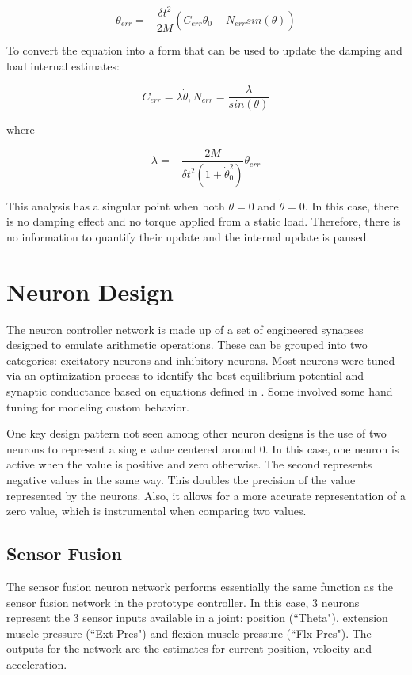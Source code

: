 \documentclass[letterpaper, 10 pt, conference]{IEEEconf} %
\newcommand{\bbs}[1]{\section{#1}}
\newcommand{\bbss}[1]{\subsection{#1}}
\begin{document}
\begin{equation}
\theta_{err} = - \dfrac{\delta t^{2}}{2M}(C_{err} \dot{\theta}_{0} + N_{err} sin(\theta))
\end{equation}

To convert the equation into a form that can be used to update the damping and
load internal estimates:

\begin{equation}
C_{err} = \lambda \dot{\theta}, N_{err} = \dfrac{\lambda}{sin(\theta)}
\end{equation}

where

\begin{equation}
\lambda 
=
- \dfrac{2M}{\delta t^{2} (1 + \dot{\theta}_{0}^{2})} \theta_{err}
\end{equation}

This analysis has a singular point when both $\theta = 0$ and $\dot{\theta} = 0$. In this case, there is no damping effect and no torque applied from a static
load. Therefore, there is no information to quantify their update and the internal update is paused.

\bbs{Neuron Design}
\label{chap:neuron_design}

The neuron controller network is made up of a set of engineered synapses
designed to emulate arithmetic operations. These can be grouped into two
categories: excitatory neurons and inhibitory neurons. Most neurons were tuned
via an optimization process to identify the best equilibrium potential and
synaptic conductance based on equations defined in 
\cite{NickFunctionalSubnetwork}. Some involved some hand tuning for modeling custom behavior.

One key design pattern not seen among other neuron designs is the use of two
neurons to represent a single value centered around 0. In this case, one neuron 
is active when the value is positive and zero otherwise. The second represents 
negative values in the same way. This doubles the precision of the value 
represented by the neurons. Also, it allows for a more accurate representation of a zero value, which is instrumental when comparing two values.

\bbss{Sensor Fusion}

The sensor fusion neuron network performs essentially the same function as the
sensor fusion network in the prototype controller. In this case, 3 neurons
represent the 3 sensor inputs available in a joint: position (``Theta"),
extension muscle pressure (``Ext Pres") and flexion muscle pressure
(``Flx Pres"). The outputs for the network are the estimates for current 
position, velocity and acceleration.
\end{document}
